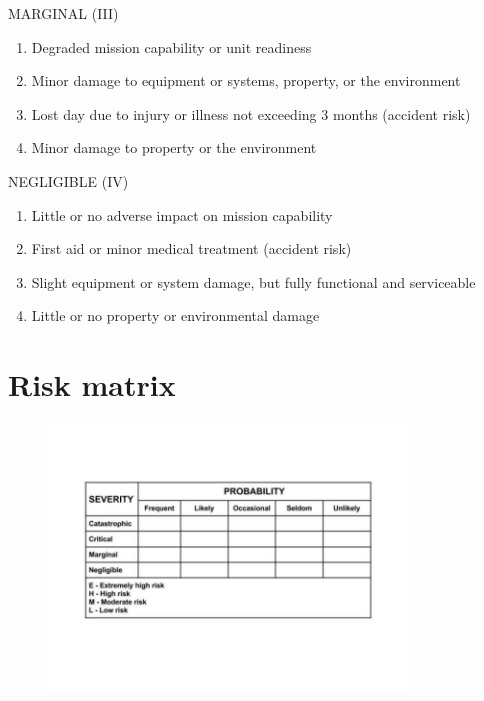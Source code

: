 \documentclass[aspectratio=1610,pdftex,dvipsnames,compress,xcolor={dvipsnames}]{beamer}
\begin{document}
\begin{frame}{MARGINAL (III)}
    \begin{enumerate}[series=outerlist,topsep=0pt,itemsep=21pt,leftmargin=*,label=(\arabic*)]
        \item[]Degraded mission capability or unit readiness
        \item[]Minor damage to equipment or systems, property, or the environment
        \item[]Lost day due to injury or illness not exceeding 3 months (accident risk)
        \item[]Minor damage to property or the environment
    \end{enumerate}
\end{frame}


\begin{frame}{NEGLIGIBLE (IV)}
    \begin{enumerate}[series=outerlist,topsep=0pt,itemsep=21pt,leftmargin=*,label=(\arabic*)]
        \item[]Little or no adverse impact on mission capability
        \item[]First aid or minor medical treatment (accident risk)
        \item[]Slight equipment or system damage, but fully functional and serviceable
        \item[]Little or no property or environmental damage
    \end{enumerate}
\end{frame}


\section{Risk matrix}


\addtocounter{framenumber}{-1}
\begin{frame}{}
    \begin{figure}
        \centering
        \includegraphics[width=0.85\textwidth]{risk.assessment.matrix.jpg}
    \end{figure}
\end{frame}
\end{document}
